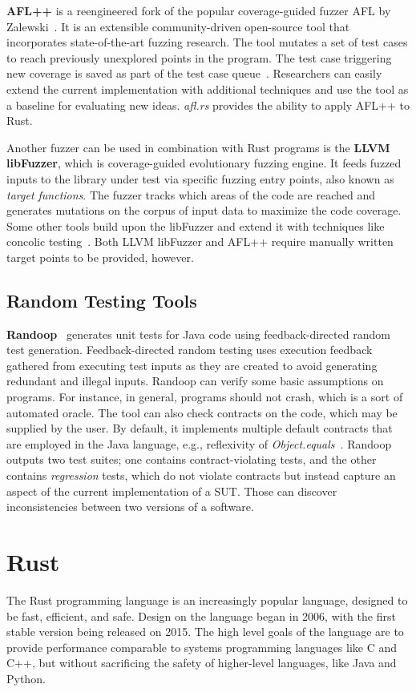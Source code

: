 \documentclass{article}
\begin{document}
\textbf{AFL++} is a reengineered fork of the popular coverage-guided fuzzer AFL by Zalewski~\cite{Zalewski2014}. It is an extensible community-driven open-source tool that incorporates state-of-the-art fuzzing research. The tool mutates a set of test cases to reach previously unexplored points in the program. The test case triggering new coverage is saved as part of the test case queue~\cite{Fioraldi2020}. Researchers can easily extend the current implementation with additional techniques and use the tool as a baseline for evaluating new ideas. \textit{afl.rs} provides the ability to apply AFL++ to Rust.

Another fuzzer can be used in combination with Rust programs is the \textbf{LLVM libFuzzer}, which is coverage-guided evolutionary fuzzing engine. It feeds fuzzed inputs to the library under test via specific fuzzing entry points, also known as \textit{target functions}. The fuzzer tracks which areas of the code are reached and generates mutations on the corpus of input data to maximize the code coverage. Some other tools build upon the libFuzzer and extend it with techniques like concolic testing~\cite{Rocha2020,Le2019}. Both LLVM libFuzzer and AFL++ require manually written target points to be provided, however.

\subsection{Random Testing Tools}
\textbf{Randoop}~\cite{Pacheco_2007} generates unit tests for Java code using feedback-directed random test generation. Feedback-directed random testing uses execution feedback gathered from executing test inputs as they are created to avoid generating redundant and illegal inputs. Randoop can verify some basic assumptions on programs. For instance, in general, programs should not crash, which is a sort of automated oracle. The tool can also check  contracts on the code, which may be supplied by the user. By default, it implements multiple default contracts that are employed in the Java language, e.g., reflexivity of \textit{Object.equals}~\cite{Fraser2013}. Randoop outputs two test suites; one contains contract-violating tests, and the other contains \textit{regression} tests, which do not violate contracts but instead capture an aspect of the current implementation of a \ac{SUT}. Those can discover inconsistencies between two versions of a software.

\section{Rust}
The Rust programming language is an increasingly popular language, designed to be fast, efficient, and safe. Design on the language began in 2006, with the first stable version being released on 2015. The high level goals of the language are to provide performance comparable to systems programming languages like C and C++, but without sacrificing the safety of higher-level languages, like Java and Python.
\end{document}
